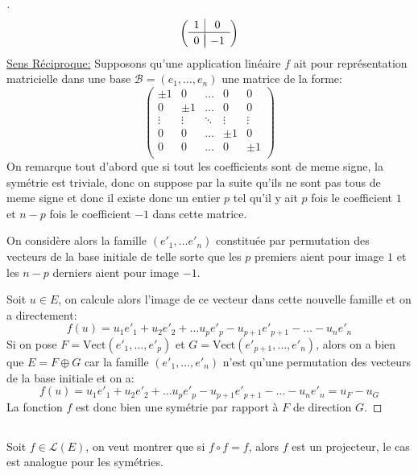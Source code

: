 \documentclass{report}
\begin{document}
\begin{proof}[\unskip\nopunct]
      \[
         \left(\begin{array}{c|c}
            1 & 0\\
            \hline\\[-1.7\medskipamount]
            0 & -1
         \end{array}\right)
      \]
      \uline{Sens Réciproque:} Supposons qu'une application linéaire \(f\) ait pour représentation matricielle dans une base \(\mathscr{B} = (e_1, \ldots, e_n)\) une matrice de la forme:
      \[
         \begin{pmatrix}
            \pm 1 & 0 & \ldots & 0 & 0\\
            0 & \pm 1 & \ldots & 0 & 0\\
            \vdots & \vdots & \ddots & \vdots & \vdots \\
            0 & 0 & \ldots & \pm 1 & 0\\
            0 & 0 & \ldots & 0 & \pm 1\\
         \end{pmatrix}   
      \]
      On remarque tout d'abord que si tout les coefficients sont de meme signe, la symétrie est triviale, donc on suppose par la suite qu'ils ne sont pas tous de meme signe et donc il existe donc un entier \(p\) tel qu'il y ait \(p\) fois le coefficient \(1\) et \(n-p\) fois le coefficient \(-1\) dans cette matrice.\<

      On considère alors la famille \((e'_1, \ldots e'_n)\) constituée par permutation des vecteurs de la base initiale de telle sorte que les \(p\) premiers aient pour image \(1\) et les \(n-p\) derniers aient pour image \(-1\).\<

      Soit \(u \in E\), on calcule alors l'image de ce vecteur dans cette nouvelle famille et on a directement:
      \[
         f(u) = u_1e'_1 + u_2e'_2 + \ldots u_{p}e'_{p} - u_{p+1}e'_{p+1} - \ldots - u_ne'_n
      \]
      Si on pose \(F = \text{Vect}(e'_1, \ldots, e'_{p})\) et \(G = \text{Vect}(e'_{p+1}, \ldots, e'_n)\), alors on a bien que \(E = F \oplus G\) car la famille \((e'_1, \ldots, e'_n)\) n'est qu'une permutation des vecteurs de la base initiale et on a:
      \[
         f(u) = u_1e'_1 + u_2e'_2 + \ldots u_{p}e'_{p} - u_{p+1}e'_{p+1} - \ldots - u_ne'_n = u_F - u_G
      \]
      La fonction \(f\) est donc bien une symétrie par rapport à \(F\) de direction \(G\).
   \end{proof}

   \subsection*{}
      Soit \(f \in \mathcal{L}(E)\), on veut montrer que si \(f \circ f = f\), alors \(f\) est un projecteur, le cas est analogue pour les symétries.\<
      
\end{document}
